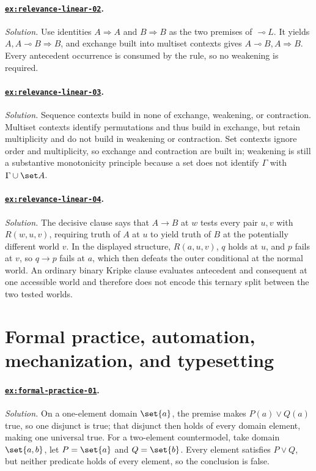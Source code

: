 \paragraph{\hyperref[ex:relevance-linear-02]{\texttt{ex:relevance-linear-02}}.}
\textit{Solution.}  Use identities \(A\Rightarrow A\) and
\(B\Rightarrow B\) as the two premises of \(\multimap L\).  It yields
\(A,A\multimap B\Rightarrow B\), and exchange built into multiset contexts
gives \(A\multimap B,A\Rightarrow B\).  Every antecedent occurrence is consumed
by the rule, so no weakening is required.

\paragraph{\hyperref[ex:relevance-linear-03]{\texttt{ex:relevance-linear-03}}.}
\textit{Solution.}  Sequence contexts build in none of exchange, weakening, or
contraction.  Multiset contexts identify permutations and thus build in
exchange, but retain multiplicity and do not build in weakening or contraction.
Set contexts ignore order and multiplicity, so exchange and contraction are
built in; weakening is still a substantive monotonicity principle because a
set does not identify \(\Gamma\) with \(\Gamma\cup\set A\).

\paragraph{\hyperref[ex:relevance-linear-04]{\texttt{ex:relevance-linear-04}}.}
\textit{Solution.}  The decisive clause says that \(A\to B\) at \(w\) tests
every pair \(u,v\) with \(R(w,u,v)\), requiring truth of \(A\) at \(u\) to
yield truth of \(B\) at the potentially different world \(v\).  In the
displayed structure, \(R(a,u,v)\), \(q\) holds at \(u\), and \(p\) fails at
\(v\), so \(q\to p\) fails at \(a\), which then defeats the outer
conditional at the normal world.  An ordinary binary Kripke clause evaluates
antecedent and consequent at one accessible world and therefore does not encode
this ternary split between the two tested worlds.

\section{Formal practice, automation, mechanization, and typesetting}

\paragraph{\hyperref[ex:formal-practice-01]{\texttt{ex:formal-practice-01}}.}
\textit{Solution.}  On a one-element domain \(\set{a}\), the premise makes
\(P(a)\lor Q(a)\) true, so one disjunct is true; that disjunct then holds of
every domain element, making one universal true.  For a two-element
countermodel, take domain \(\set{a,b}\), let \(P=\set{a}\) and
\(Q=\set{b}\).  Every element satisfies \(P\lor Q\), but neither predicate
holds of every element, so the conclusion is false.

